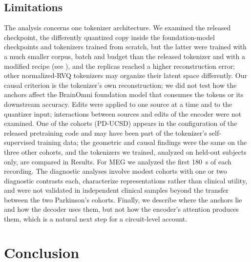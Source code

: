 \documentclass[10pt,letterpaper]{article}
\begin{document}
\subsection*{Limitations}

The analysis concerns one tokenizer architecture. We examined the released checkpoint, the
differently quantized copy inside the foundation-model checkpoints and \NumReplicas{} tokenizers
trained from scratch, but the latter were trained with a much smaller corpus, batch and budget
than the released tokenizer and with a modified recipe (see ), and the replicas
reached a higher reconstruction error; other normalized-RVQ tokenizers may organize
their latent space differently. Our causal criterion is the tokenizer's own reconstruction; we
did not test how the anchors affect the BrainOmni foundation model that consumes the tokens or
its downstream accuracy. Edits were applied to one source at a time and to the quantizer input;
interactions between sources and edits of the encoder were not examined. One of the cohorts
(PD-UCSD) appears in the configuration of the released pretraining code and may have been part
of the tokenizer's self-supervised training data; the geometric and causal findings were the
same on the three other cohorts, and the tokenizers we trained, analyzed on held-out subjects only,
are compared in Results. For MEG we analyzed the first 180~s of each recording. The diagnostic analyses involve modest cohorts with
one or two diagnostic contrasts each, characterize representations rather than clinical utility, and were not
validated in independent clinical samples beyond the transfer between the two Parkinson's
cohorts. Finally, we describe where the anchors lie and how the decoder uses them, but not how
the encoder's attention produces them, which is a natural next step for a circuit-level account.

\section*{Conclusion}\label{sec:conclusion}
\end{document}
